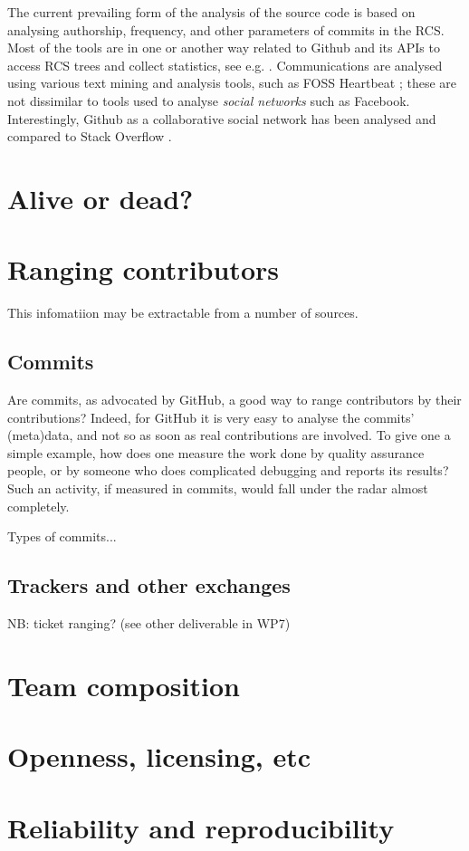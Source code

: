 \documentclass{deliverablereport}
\begin{document}
The current prevailing form of the analysis of the source code is
based on analysing authorship, frequency, and other parameters of commits
in the RCS. Most of the tools are in one or another way related to 
Github and its APIs to access RCS trees and collect statistics,
see e.g. \cite{wp7:afronshapeoss}.
Communications are analysed using various text mining and analysis tools,
such as FOSS Heartbeat \cite{wp7:fossheartbeat};
these are not dissimilar to tools used to analyse {\em social networks}
such as Facebook.
Interestingly, Github as a collaborative social network has been
analysed \cite{wp7:githubandsof,DBLP:journals/corr/LimaRM14,DBLP:journals/corr/VasilescuSWSB15}
and compared to Stack Overflow \cite{wp7:stackoverflow}.

\section{Alive or dead?}

\section{Ranging contributors}
This infomatiion may be extractable from a number of sources.

\subsection{Commits}
Are commits, as advocated by GitHub, a good way to range contributors by their
contributions? Indeed, for GitHub it is very easy to analyse the commits' (meta)data,
and not so as soon as real contributions are involved. To give one a simple example, how does
one measure the work done by quality assurance people, or by someone who does complicated debugging
and reports its results? Such an activity, if measured in commits, would fall under the radar almost
completely.

Types of commits...

\subsection{Trackers and other exchanges}

NB: ticket ranging? (see other deliverable in WP7)

\section{Team composition}

\section{Openness, licensing, etc}

\section{Reliability and reproducibility}

\printbibliography
\end{document}
